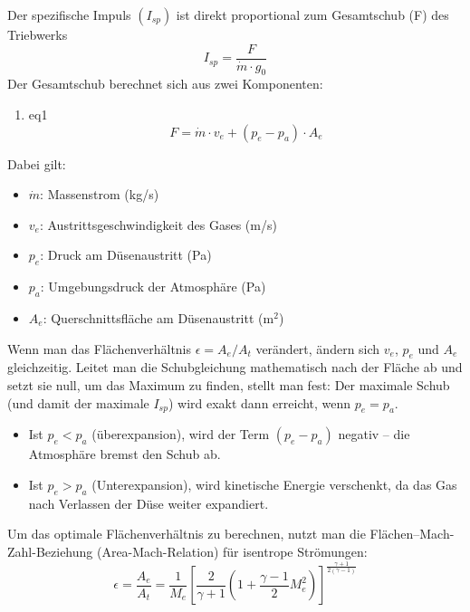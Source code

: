 \documentclass{scrartcl}
\begin{document}
Der spezifische Impuls $(I_{sp})$ ist direkt proportional zum Gesamtschub (F) des Triebwerks
\begin{equation*}
I_{sp} = \frac{F}{\dot{m} \cdot g_0}
\end{equation*}
Der Gesamtschub berechnet sich aus zwei Komponenten:
\begin{enumerate}
    \item eq1
    \begin{equation}
        F=\dot{m}\cdot v_{e}+(p_{e}-p_{a})\cdot A_{e}
    \end{equation}
\end{enumerate}

Dabei gilt:
\begin{itemize}
    \item $\dot{m}$: Massenstrom (kg/s)
    \item $v_{e}$: Austrittsgeschwindigkeit des Gases (m/s)
    \item $p_{e}$: Druck am Düsenaustritt (Pa)
    \item $p_{a}$: Umgebungsdruck der Atmosphäre (Pa)
    \item $A_{e}$: Querschnittsfläche am Düsenaustritt ($\mathrm{m}^{2}$)
\end{itemize}

Wenn man das Flächenverhältnis $\epsilon = A_e / A_t$ verändert, ändern sich $v_{e}$, $p_{e}$ und $A_{e}$ gleichzeitig. Leitet man die Schubgleichung mathematisch nach der Fläche ab und setzt sie null, um das Maximum zu finden, stellt man fest: Der maximale Schub (und damit der maximale $I_{sp}$) wird exakt dann erreicht, wenn $p_e = p_a$.

\begin{itemize}
    \item Ist $p_e < p_a$ (überexpansion), wird der Term $(p_e - p_a)$ negativ -- die Atmosphäre bremst den Schub ab.
    \item Ist $p_e > p_a$ (Unterexpansion), wird kinetische Energie verschenkt, da das Gas nach Verlassen der Düse weiter expandiert.
\end{itemize}

Um das optimale Flächenverhältnis zu berechnen, nutzt man die Flächen--Mach-Zahl-Beziehung (Area-Mach-Relation) für isentrope Strömungen:
\begin{equation}
\epsilon = \frac{A_{e}}{A_{t}}=\frac{1}{M_{e}}\left[\frac{2}{\gamma +1}\left(1+\frac{\gamma -1}{2}M_{e}^{2}\right)\right]^{\frac{\gamma +1}{2(\gamma -1)}}
\end{equation}
\end{document}
